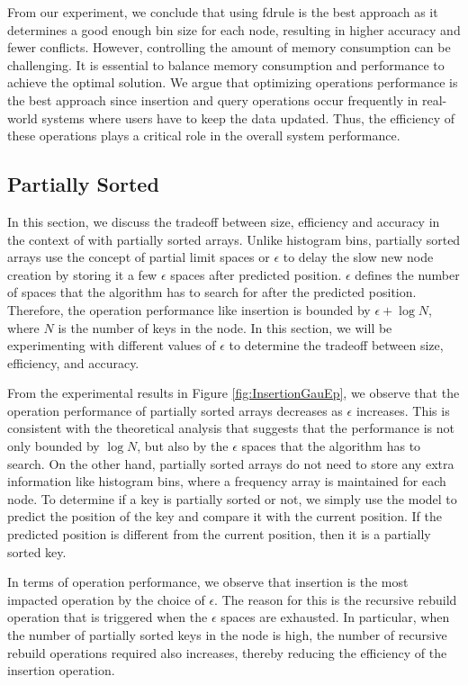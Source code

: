 From our experiment, we conclude that using \acrshort{fdrule} is the best approach as it determines a good enough bin size for each node, resulting in higher accuracy and fewer conflicts. However, controlling the amount of memory consumption can be challenging. It is essential to balance memory consumption and performance to achieve the optimal solution. We argue that optimizing operations performance is the best approach since insertion and query operations occur frequently in real-world systems where users have to keep the data updated. Thus, the efficiency of these operations plays a critical role in the overall system performance.


\subsection{Partially Sorted} 
In this section, we discuss the tradeoff between size, efficiency and accuracy in the context of \learnindex with partially sorted arrays. Unlike histogram bins, partially sorted arrays use the concept of partial limit spaces or $\epsilon$ to delay the slow new node creation by storing it a few $\epsilon$ spaces after predicted position. $\epsilon$ defines the number of spaces that the algorithm has to search for after the predicted position. Therefore, the operation performance like insertion is bounded by $\epsilon + \log N$, where $N$ is the number of keys in the node. In this section, we will be experimenting with different values of $\epsilon$ to determine the tradeoff between size, efficiency, and accuracy.

From the experimental results in Figure \ref{fig:InsertionGauEp}, we observe that the operation performance of partially sorted arrays decreases as $\epsilon$ increases. This is consistent with the theoretical analysis that suggests that the performance is not only bounded by $\log N$, but also by the $\epsilon$ spaces that the algorithm has to search. On the other hand, partially sorted arrays do not need to store any extra information like histogram bins, where a frequency array is maintained for each node. To determine if a key is partially sorted or not, we simply use the model to predict the position of the key and compare it with the current position. If the predicted position is different from the current position, then it is a partially sorted key.

In terms of operation performance, we observe that insertion is the most impacted operation by the choice of $\epsilon$. The reason for this is the recursive rebuild operation that is triggered when the $\epsilon$ spaces are exhausted. In particular, when the number of partially sorted keys in the node is high, the number of recursive rebuild operations required also increases, thereby reducing the efficiency of the insertion operation.

